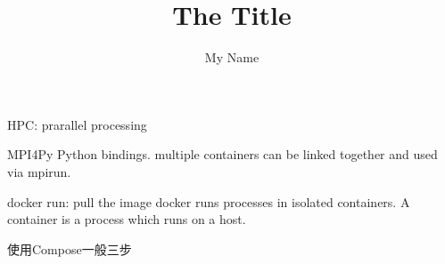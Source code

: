 \documentclass{article}
\author{My Name}
\title{The Title}
\begin{document}
HPC: prarallel processing	

MPI4Py Python bindings.
multiple containers can be linked together and used via mpirun.

docker run: pull the image
docker runs processes in isolated containers. A container is a process which runs on a host.

{\color{red}{Compose ia a tool for defining and runing multi-container Docker applications}}

使用Compose一般三步

 




	
\end{document}
